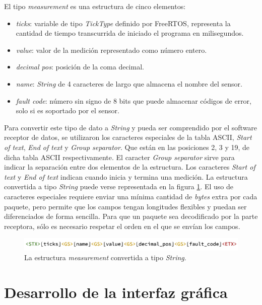 El tipo \textit{measurement} es una estructura de cinco elementos:

\begin{itemize}
\item{\textit{ticks}:} variable de tipo \textit{TickType} definido por FreeRTOS, representa la cantidad de tiempo transcurrida de iniciado el programa en milisegundos.
\item{\textit{value}:} valor de la medición representado como número entero.
\item{\textit{decimal pos}:} posición de la coma decimal.
\item{\textit{name}:} \textit{String} de 4 caracteres de largo que almacena el nombre del sensor.
\item{\textit{fault code}:} número sin signo de 8 bits que puede almacenar códigos de error, solo si es soportado por el sensor.
\end{itemize}

Para convertir este tipo de dato a \textit{String} y pueda ser comprendido por el software receptor de datos, se utilizaron los caracteres especiales de la tabla ASCII, \textit{Start of text}, \textit{End of text} y \textit{Group separator}. Que están en las posiciones 2, 3 y 19, de dicha tabla ASCII respectivamente. El caracter \textit{Group separator} sirve para indicar la separación entre dos elementos de la estructura. Los caracteres \textit{Start of text} y \textit{End of text} indican cuando inicia y termina una medición. La estructura convertida a tipo \textit{String} puede verse representada en la figura \ref{fig:measurement-string}. El uso de caracteres especiales requiere enviar una mínima cantidad de \textit{bytes} extra por cada paquete, pero permite que los campos tengan longitudes flexibles y puedan ser diferenciados de forma sencilla. Para que un paquete sea decodificado por la parte receptora, sólo es necesario respetar el orden en el que se envían los campos.

\begin{figure}[htpb]
\centering
\includegraphics[width=.9\textwidth]{./Figures/measurement-string.png}
\caption{La estructura \textit{measurement} convertida a tipo \textit{String}.}
\label{fig:measurement-string}
\end{figure}


\section{Desarrollo de la interfaz gráfica}

